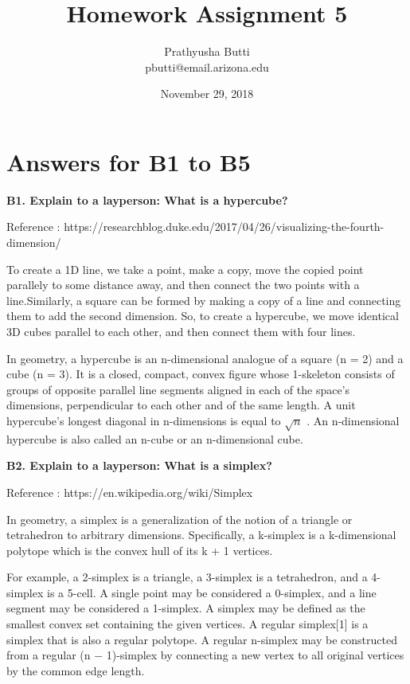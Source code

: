 \documentclass{article}[12pt]
\begin{document}
\title{Homework Assignment 5 \\}
\date{November 29, 2018}

\author{
   Prathyusha Butti \\
   pbutti@email.arizona.edu
}

\maketitle

\section { Answers for B1 to B5 }
\hfill \break

\noindent
{ \bf B1. Explain to a layperson: What is a hypercube? }
{
 
 Reference : https://researchblog.duke.edu/2017/04/26/visualizing-the-fourth-dimension/

To create a 1D line, we take a point, make a copy, move the copied point parallely to some distance away, and then connect the two points with a line.Similarly, a square can be formed by making a copy of a line and connecting them to add the second dimension. So, to create a hypercube, we move identical 3D cubes parallel to each other, and then connect them with four lines.

In geometry, a hypercube is an n-dimensional analogue of a square (n = 2) and a cube (n = 3). It is a closed, compact, convex figure whose 1-skeleton consists of groups of opposite parallel line segments aligned in each of the space's dimensions, perpendicular to each other and of the same length. A unit hypercube's longest diagonal in n-dimensions is equal to $\sqrt{{n}}$ .  An n-dimensional hypercube is also called an n-cube or an n-dimensional cube. 
  
}

\vspace{2ex}\noindent
{ \bf B2. Explain to a layperson: What is a simplex?  }
{
    
    Reference : https://en.wikipedia.org/wiki/Simplex
    
    In geometry, a simplex is a generalization of the notion of a triangle or tetrahedron to arbitrary dimensions. Specifically, a k-simplex is a k-dimensional polytope which is the convex hull of its k + 1 vertices.
    
    For example, a 2-simplex is a triangle, a 3-simplex is a tetrahedron, and a 4-simplex is a 5-cell. A single point may be considered a 0-simplex, and a line segment may be considered a 1-simplex. A simplex may be defined as the smallest convex set containing the given vertices. A regular simplex[1] is a simplex that is also a regular polytope. A regular n-simplex may be constructed from a regular (n − 1)-simplex by connecting a new vertex to all original vertices by the common edge length.
}
\end{document}
